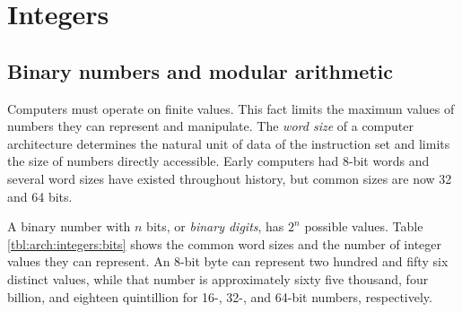 \section{Integers}

\label{sec:arch:int}

\subsection{Binary numbers and modular arithmetic}

\label{subsec:arch:bin}

Computers must operate on finite values.  This fact limits the maximum values of
numbers they can represent and manipulate.  The \textit{word size}\footnotemark
of a computer architecture determines the natural unit of data of the
instruction set and limits the size of numbers directly accessible.  Early
computers had 8-bit words and several word sizes have existed throughout
history, but common sizes are now 32 and 64 bits.


A binary number with $n$ bits, or \textit{binary digits}, has $2^n$ possible
values.  Table \ref{tbl:arch:integers:bits} shows the common word sizes and the
number of integer values they can represent.  An 8-bit byte can represent two
hundred and fifty six distinct values, while that number is approximately sixty
five thousand, four billion, and eighteen quintillion for 16-, 32-, and 64-bit
numbers, respectively\footnotemark.


